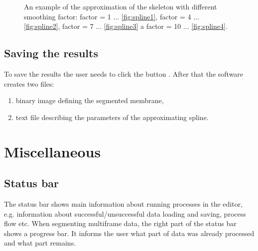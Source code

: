 \begin{figure}[htb]
	\hskip 0.1cm
	\caption{An example of the approximation of the skeleton with different smoothing factor: factor = 1 ... \ref{fig:spline1}, factor = 4 ... \ref{fig:spline2}, factor = 7 ... \ref{fig:spline3} a factor = 10 ... \ref{fig:spline4}.}
	\label{fig:spline}
\end{figure}

\subsection{Saving the results}
To save the results the user needs to click the button . After that the software creates two files:
\begin{enumerate}
	\item binary image defining the segmented membrane, 
	\item text file describing the parameters of the approximating spline.
\end{enumerate}

\section{Miscellaneous}

\subsection{Status bar}
The status bar  shows main information about running processes in the editor, e.g. information about successful/unsuccessful data loading and saving, process flow etc. When segmenting multiframe data, the right part of the status bar shows a progress bar. It informs the user what part of data was already processed and what part remains. 

